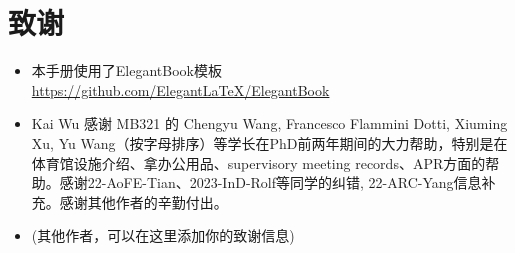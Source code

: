 \chapter{致谢}
\begin{itemize}
    \item 本手册使用了ElegantBook模板 \url{https://github.com/ElegantLaTeX/ElegantBook}
    \item Kai Wu 感谢 MB321 的 Chengyu Wang, Francesco Flammini Dotti, Xiuming Xu, Yu Wang（按字母排序）等学长在PhD前两年期间的大力帮助，特别是在体育馆设施介绍、拿办公用品、supervisory meeting records、APR方面的帮助。感谢22-AoFE-Tian、2023-InD-Rolf等同学的纠错, 22-ARC-Yang信息补充。感谢其他作者的辛勤付出。
    \item (其他作者，可以在这里添加你的致谢信息)
\end{itemize}


